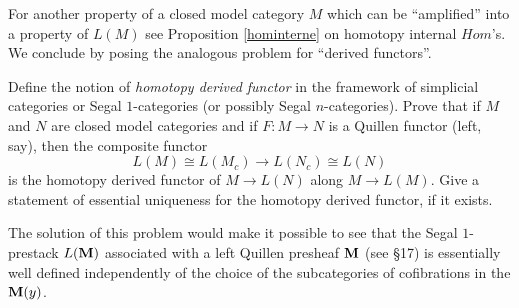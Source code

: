 For another property of a closed model category
$M$ which can
be ``amplified''
into a property of $L(M)$ see Proposition
\ref{hominterne} on homotopy internal $Hom$'s.
We conclude by posing the analogous problem for ``derived
functors''.

\begin{problem}
\label{derive}
Define the notion of {\em homotopy derived functor} in the framework of
simplicial categories or Segal $1$-categories (or possibly Segal
$n$-categories). Prove that if $M$ and $N$ are closed model
categories and if $F: M\rightarrow N$ is a Quillen functor (left,
say), then the composite functor
$$
L(M)\cong L(M_c)\rightarrow L(N_c)\cong L(N)
$$
is the homotopy derived functor of $M\rightarrow L(N)$ along
$M\rightarrow L(M)$. Give a statement of essential uniqueness for the
homotopy derived functor, if it exists.
\end{problem}

The solution of
this problem would make it possible to see that the Segal $1$-prestack
$L({\bf M} )$ associated with a left Quillen presheaf ${\bf M}$ (see \S 17)
is essentially well defined independently of the choice of the
subcategories
of cofibrations in the ${\bf M} (y)$.
